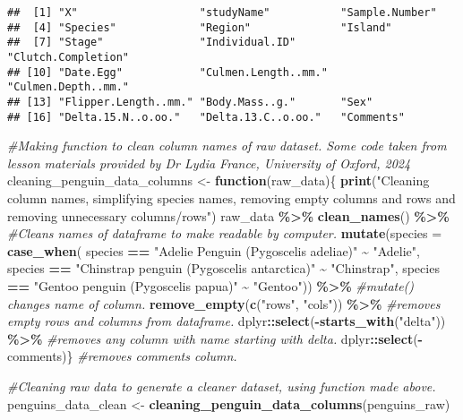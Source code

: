 \documentclass[
]{article}
\newenvironment{Shaded}{\begin{snugshade}}{\end{snugshade}}
\newcommand{\AttributeTok}[1]{\textcolor[rgb]{0.13,0.29,0.53}{#1}}
\newcommand{\CommentTok}[1]{\textcolor[rgb]{0.56,0.35,0.01}{\textit{#1}}}
\newcommand{\ControlFlowTok}[1]{\textcolor[rgb]{0.13,0.29,0.53}{\textbf{#1}}}
\newcommand{\FunctionTok}[1]{\textcolor[rgb]{0.13,0.29,0.53}{\textbf{#1}}}
\newcommand{\NormalTok}[1]{#1}
\newcommand{\OtherTok}[1]{\textcolor[rgb]{0.56,0.35,0.01}{#1}}
\newcommand{\SpecialCharTok}[1]{\textcolor[rgb]{0.81,0.36,0.00}{\textbf{#1}}}
\newcommand{\StringTok}[1]{\textcolor[rgb]{0.31,0.60,0.02}{#1}}
\begin{document}
\begin{verbatim}
##  [1] "X"                   "studyName"           "Sample.Number"      
##  [4] "Species"             "Region"              "Island"             
##  [7] "Stage"               "Individual.ID"       "Clutch.Completion"  
## [10] "Date.Egg"            "Culmen.Length..mm."  "Culmen.Depth..mm."  
## [13] "Flipper.Length..mm." "Body.Mass..g."       "Sex"                
## [16] "Delta.15.N..o.oo."   "Delta.13.C..o.oo."   "Comments"
\end{verbatim}

\begin{Shaded}
\begin{Highlighting}[]
\CommentTok{\#Making function to clean column names of raw dataset. Some code taken from lesson materials provided by Dr Lydia France, University of Oxford, 2024}
\NormalTok{cleaning\_penguin\_data\_columns }\OtherTok{\textless{}{-}} \ControlFlowTok{function}\NormalTok{(raw\_data)\{}
  \FunctionTok{print}\NormalTok{(}\StringTok{"Cleaning column names, simplifying species names, removing empty columns and rows and removing unnecessary columns/rows"}\NormalTok{)}
\NormalTok{  raw\_data }\SpecialCharTok{\%\textgreater{}\%} 
    \FunctionTok{clean\_names}\NormalTok{() }\SpecialCharTok{\%\textgreater{}\%} \CommentTok{\#Cleans names of dataframe to make readable by computer.}
    \FunctionTok{mutate}\NormalTok{(}\AttributeTok{species =} \FunctionTok{case\_when}\NormalTok{(}
\NormalTok{      species }\SpecialCharTok{==} \StringTok{"Adelie Penguin (Pygoscelis adeliae)"} \SpecialCharTok{\textasciitilde{}} \StringTok{"Adelie"}\NormalTok{,}
\NormalTok{      species }\SpecialCharTok{==} \StringTok{"Chinstrap penguin (Pygoscelis antarctica)"} \SpecialCharTok{\textasciitilde{}} \StringTok{"Chinstrap"}\NormalTok{,}
\NormalTok{      species }\SpecialCharTok{==} \StringTok{"Gentoo penguin (Pygoscelis papua)"} \SpecialCharTok{\textasciitilde{}} \StringTok{"Gentoo"}\NormalTok{)) }\SpecialCharTok{\%\textgreater{}\%} \CommentTok{\#mutate() changes name of column.}
    \FunctionTok{remove\_empty}\NormalTok{(}\FunctionTok{c}\NormalTok{(}\StringTok{"rows"}\NormalTok{, }\StringTok{"cols"}\NormalTok{)) }\SpecialCharTok{\%\textgreater{}\%} \CommentTok{\#removes empty rows and columns from dataframe.}
\NormalTok{    dplyr}\SpecialCharTok{::}\FunctionTok{select}\NormalTok{(}\SpecialCharTok{{-}}\FunctionTok{starts\_with}\NormalTok{(}\StringTok{"delta"}\NormalTok{)) }\SpecialCharTok{\%\textgreater{}\%} \CommentTok{\#removes any column with name starting with delta.}
\NormalTok{    dplyr}\SpecialCharTok{::}\FunctionTok{select}\NormalTok{(}\SpecialCharTok{{-}}\NormalTok{comments)\} }\CommentTok{\#removes comments column.}

\CommentTok{\#Cleaning raw data to generate a cleaner dataset, using function made above.}
\NormalTok{penguins\_data\_clean }\OtherTok{\textless{}{-}} \FunctionTok{cleaning\_penguin\_data\_columns}\NormalTok{(penguins\_raw)}
\end{Highlighting}
\end{Shaded}
\end{document}
